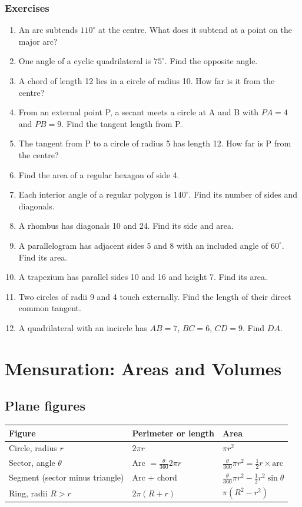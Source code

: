 \documentclass[11pt,a4paper,openany]{report}
\newenvironment{exercises}{\subsection*{Exercises \thechapter}\begin{enumerate}[label=\textbf{\thechapter.\arabic*},leftmargin=3.2em]}{\end{enumerate}}
\begin{document}
\begin{exercises}
\item An arc subtends $110^\circ$ at the centre. What does it subtend at a point on the major arc?
\item One angle of a cyclic quadrilateral is $75^\circ$. Find the opposite angle.
\item A chord of length 12 lies in a circle of radius 10. How far is it from the centre?
\item From an external point P, a secant meets a circle at A and B with $PA=4$ and $PB=9$. Find the tangent length from P.
\item The tangent from P to a circle of radius 5 has length 12. How far is P from the centre?
\item Find the area of a regular hexagon of side 4.
\item Each interior angle of a regular polygon is $140^\circ$. Find its number of sides and diagonals.
\item A rhombus has diagonals 10 and 24. Find its side and area.
\item A parallelogram has adjacent sides 5 and 8 with an included angle of $60^\circ$. Find its area.
\item A trapezium has parallel sides 10 and 16 and height 7. Find its area.
\item Two circles of radii 9 and 4 touch externally. Find the length of their direct common tangent.
\item A quadrilateral with an incircle has $AB=7$, $BC=6$, $CD=9$. Find $DA$.
\end{exercises}

\chapter{Mensuration: Areas and Volumes}\label{ch:mens}

\section{Plane figures}
\begin{center}\small
\begin{tabular}{lll}
\toprule
Figure & Perimeter or length & Area\\\midrule
Circle, radius $r$ & $2\pi r$ & $\pi r^2$\\
Sector, angle $\theta$ & Arc $=\frac\theta{360}2\pi r$ & $\frac\theta{360}\pi r^2=\frac12r\times\text{arc}$\\
Segment (sector minus triangle) & Arc $+$ chord & $\frac\theta{360}\pi r^2-\frac12r^2\sin\theta$\\
Ring, radii $R>r$ & $2\pi(R+r)$ & $\pi(R^2-r^2)$\\
\bottomrule
\end{tabular}
\end{center}
\end{document}
